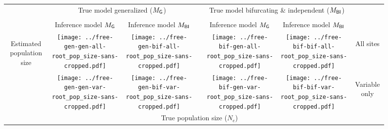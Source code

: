 \documentclass[border=10pt,varwidth=30cm]{standalone}
\newcommand{\genmodel}{\ensuremath{M_{\textrm{\sffamily G}}}\xspace}
\newcommand{\bimodel}{\ensuremath{M_{\textrm{\sffamily BI}}}\xspace}
\begin{document}
\begin{figure}
    \setlength\arrayrulewidth{2pt}
    \centering
    \begin{tabular}{@{}ccccccc@{}}
        & \multicolumn{2}{c}{\LARGE True model generalized (\genmodel)}
        &
        & \multicolumn{2}{c}{\LARGE True model bifurcating \& independent (\bimodel)}
        & \\[1ex]
        \cline{2-3}\cline{5-6}
        & & & & & & \\
        & \multirow{1}{0.19\textwidth}{\centering\Large Inference model \genmodel}
        & \multirow{1}{0.19\textwidth}{\centering\Large Inference model \bimodel}
        &
        & \multirow{1}{0.19\textwidth}{\centering\Large Inference model \genmodel}
        & \multirow{1}{0.19\textwidth}{\centering\Large Inference model \bimodel}
        & \\[4ex]
        \multirow{2}{*}[5em]{\begin{sideways}\Large Estimated population size\end{sideways}}
        & \texttt{[image: ../free-gen-gen-all-root\_pop\_size-sans-cropped.pdf]}
        & \texttt{[image: ../free-gen-bif-all-root\_pop\_size-sans-cropped.pdf]}
        &
        & \texttt{[image: ../free-bif-gen-all-root\_pop\_size-sans-cropped.pdf]}
        & \texttt{[image: ../free-bif-bif-all-root\_pop\_size-sans-cropped.pdf]}
        & \multirow{1}{*}[9em]{\begin{sideways}\Large All sites\end{sideways}} \\
        & \texttt{[image: ../free-gen-gen-var-root\_pop\_size-sans-cropped.pdf]}
        & \texttt{[image: ../free-gen-bif-var-root\_pop\_size-sans-cropped.pdf]}
        &
        & \texttt{[image: ../free-bif-gen-var-root\_pop\_size-sans-cropped.pdf]}
        & \texttt{[image: ../free-bif-bif-var-root\_pop\_size-sans-cropped.pdf]}
        & \multirow{1}{*}[10em]{\begin{sideways}\Large Variable only\end{sideways}} \\
        & \multicolumn{5}{c}{\Large True population size ($N_e$)} & \\
    \end{tabular}
\end{figure}
\end{document}
